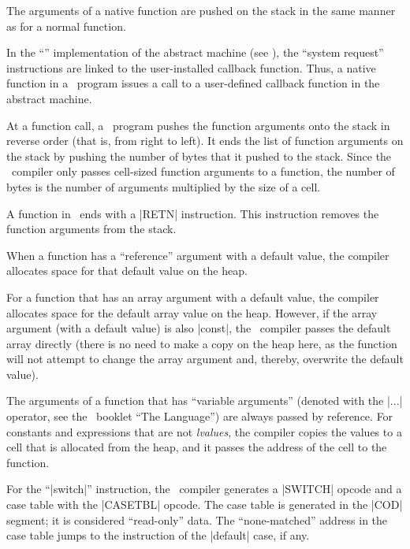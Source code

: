   The arguments of a native function are pushed on the stack in the same
  manner as for a normal function.

  In the ``\Small'' implementation of the abstract machine (see ),
  the ``system request'' instructions are linked to the user-installed
  callback function. Thus, a native function in a \Small\ program issues a
  call to a user-defined callback function in the abstract machine.

\list{\lbullet}
  At a function call, a \Small\ program pushes the function arguments onto the
  stack in reverse order (that is, from right to left). It ends the list of
  function arguments on the stack by pushing the number of bytes that it pushed
  to the stack. Since the \Small\ compiler only passes cell-sized function
  arguments to a function, the number of bytes is the number of arguments
  multiplied by the size of a cell.

  A function in \Small\ ends with a |RETN| instruction. This instruction removes
  the function arguments from the stack.

\list{\lbullet}
  When a function has a ``reference'' argument with a default value, the
  compiler allocates space for that default value on the heap.

  For a function that has an array argument with a default value, the compiler
  allocates space for the default array value on the heap. However, if the
  array argument (with a default value) is also |const|, the \Small\ compiler
  passes the default array directly (there is no need to make a copy on the
  heap here, as the function will not attempt to change the array argument and,
  thereby, overwrite the default value).

\list{\lbullet}
  The arguments of a function that has ``variable arguments'' (denoted with
  the |...| operator, see the \Small\ booklet ``The Language'') %
  are always passed by reference. For constants and expressions that are not
  {\it lvalues\/}, the compiler copies the values to a cell that is allocated
  from the heap, and it passes the address of the cell to the function.

\list{\lbullet}
  For the ``|switch|'' instruction, the \Small\ compiler generates a |SWITCH|
  opcode and a case table with the |CASETBL| opcode. The case table is
  generated in the |COD| segment; it is considered ``read-only'' data. The
  ``none-matched'' address in the case table jumps to the instruction
  of the |default| case, if any.

